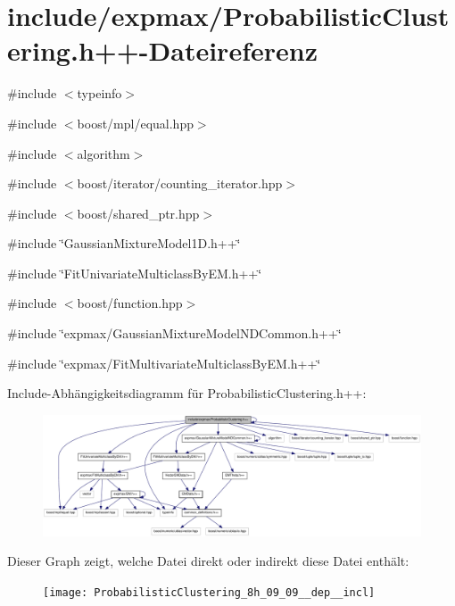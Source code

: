 \hypertarget{ProbabilisticClustering_8h_09_09}{
\section{include/expmax/ProbabilisticClustering.h++-\/Dateireferenz}
\label{ProbabilisticClustering_8h_09_09}
}
{\ttfamily \#include $<$typeinfo$>$}\par
{\ttfamily \#include $<$boost/mpl/equal.hpp$>$}\par
{\ttfamily \#include $<$algorithm$>$}\par
{\ttfamily \#include $<$boost/iterator/counting\_\-iterator.hpp$>$}\par
{\ttfamily \#include $<$boost/shared\_\-ptr.hpp$>$}\par
{\ttfamily \#include \char`\"{}GaussianMixtureModel1D.h++\char`\"{}}\par
{\ttfamily \#include \char`\"{}FitUnivariateMulticlassByEM.h++\char`\"{}}\par
{\ttfamily \#include $<$boost/function.hpp$>$}\par
{\ttfamily \#include \char`\"{}expmax/GaussianMixtureModelNDCommon.h++\char`\"{}}\par
{\ttfamily \#include \char`\"{}expmax/FitMultivariateMulticlassByEM.h++\char`\"{}}\par
Include-\/Abhängigkeitsdiagramm für ProbabilisticClustering.h++:\nopagebreak
\begin{figure}[H]
\begin{center}
\leavevmode
\includegraphics[width=420pt]{ProbabilisticClustering_8h_09_09__incl}
\end{center}
\end{figure}
Dieser Graph zeigt, welche Datei direkt oder indirekt diese Datei enthält:\nopagebreak
\begin{figure}[H]
\begin{center}
\leavevmode
\texttt{[image: ProbabilisticClustering\_8h\_09\_09\_\_dep\_\_incl]}
\end{center}
\end{figure}


